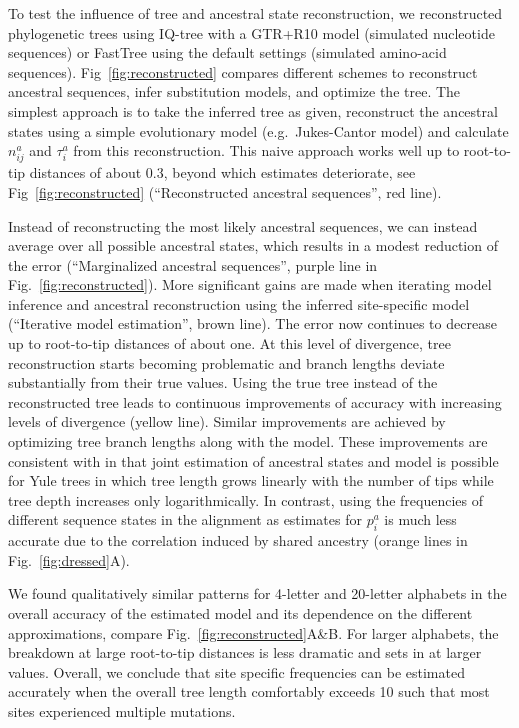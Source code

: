 \documentclass[aps,rmp,twocolumn,linenumbers]{revtex4-1}
\newcommand{\eqp}{p}
\begin{document}
To test the influence of tree and ancestral state reconstruction, we reconstructed phylogenetic trees using IQ-tree \citep{nguyen_iq-tree:_2015} with a GTR+R10 model (simulated nucleotide sequences) or FastTree \citep{FastTree} using the default settings (simulated amino-acid sequences).
Fig~\ref{fig:reconstructed} compares different schemes to reconstruct ancestral sequences, infer substitution models, and optimize the tree.
The simplest approach is to take the inferred tree as given, reconstruct the ancestral states using a simple evolutionary model (e.g.~Jukes-Cantor model) and calculate $n^a_{ij}$ and $\tau_i^a$ from this reconstruction.
This naive approach works well up to root-to-tip distances of about 0.3, beyond which estimates deteriorate, see Fig~\ref{fig:reconstructed} (``Reconstructed ancestral sequences'', red line).

Instead of reconstructing the most likely ancestral sequences, we can instead average over all possible ancestral states, which results in a modest reduction of the error (``Marginalized ancestral sequences'', purple line in Fig.~\ref{fig:reconstructed}).
More significant gains are made when iterating model inference and ancestral reconstruction using the inferred site-specific model (``Iterative model estimation'', brown line).
The error now continues to decrease up to root-to-tip distances of about one.
At this level of divergence, tree reconstruction starts becoming problematic and branch lengths deviate substantially from their true values.
Using the true tree instead of the reconstructed tree leads to continuous improvements of accuracy with increasing levels of divergence (yellow line).
Similar improvements are achieved by optimizing tree branch lengths along with the model.
These improvements are consistent with \citet{gascuel_darwinian_2020} in that joint estimation of ancestral states and model is possible for Yule trees in which tree length grows linearly with the number of tips while tree depth increases only logarithmically.
In contrast, using the frequencies of different sequence states in the alignment as estimates for $\eqp_i^a$ is much less accurate due to the correlation induced by shared ancestry (orange lines in Fig.~\ref{fig:dressed}A).

We found qualitatively similar patterns for 4-letter and 20-letter alphabets in the overall accuracy of the estimated model and its dependence on the different approximations, compare Fig.~\ref{fig:reconstructed}A\&B.
For larger alphabets, the breakdown at large root-to-tip distances is less dramatic and sets in at larger values.
Overall, we conclude that site specific frequencies can be estimated accurately when the overall tree length comfortably exceeds 10 such that most sites experienced multiple mutations.
\end{document}
